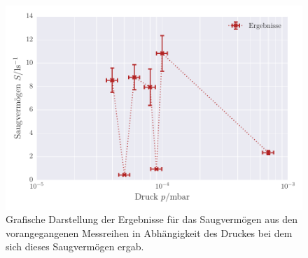 \begin{figure}[!h]
 \centering
 \includegraphics[scale=0.9]{../Grafiken/Saugvermoegen_Turbo.pdf}
 \caption{Grafische Darstellung der Ergebnisse für das Saugvermögen aus den vorangegangenen Messreihen in 
 	Abhängigkeit des Druckes bei dem sich dieses Saugvermögen ergab. \label{fig:saugvermögen_turbo}}
 \end{figure} 